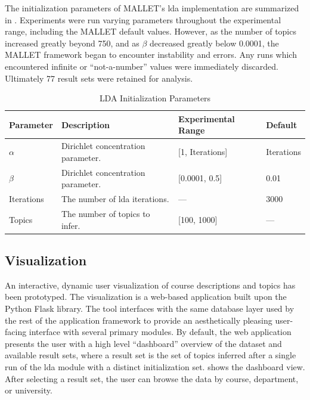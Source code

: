 
The initialization parameters of MALLET's \ac{lda} implementation are summarized in .
Experiments were run varying parameters throughout the experimental range, including the MALLET default values.
However, as the number of topics increased greatly beyond 750, and as $\beta$ decreased greatly below 0.0001, the MALLET framework began to encounter instability and errors.
Any runs which encountered infinite or ``not-a-number'' values were immediately discarded.
Ultimately 77 result sets were retained for analysis.


\begin{table}[ht]
\centering
\begin{tabular}{llll}
\toprule
Parameter  & Description & Experimental Range & Default \\
\midrule
$\alpha$   & Dirichlet concentration parameter. & [1, Iterations] & Iterations \\
$\beta$    & Dirichlet concentration parameter. & [0.0001, 0.5] & 0.01 \\
Iterations & The number of \ac{lda} iterations. & --- & 3000 \\
Topics     & The number of topics to infer. & [100, 1000] & --- \\
\bottomrule
\end{tabular}
\caption{LDA Initialization Parameters\label{table:lda-parameters}}
\end{table}


\subsection{Visualization}
\label{sec:visualization}


An interactive, dynamic user visualization of course descriptions and topics has been prototyped.
The visualization is a web-based application built upon the Python Flask library.
The tool interfaces with the same database layer used by the rest of the application framework to provide an aesthetically pleasing user-facing interface with several primary modules.
By default, the web application presents the user with a high level ``dashboard'' overview of the dataset and available result sets, where a result set is the set of topics inferred after a single run of the \ac{lda} module with a distinct initialization set.
 shows the dashboard view.
After selecting a result set, the user can browse the data by course, department, or university.

